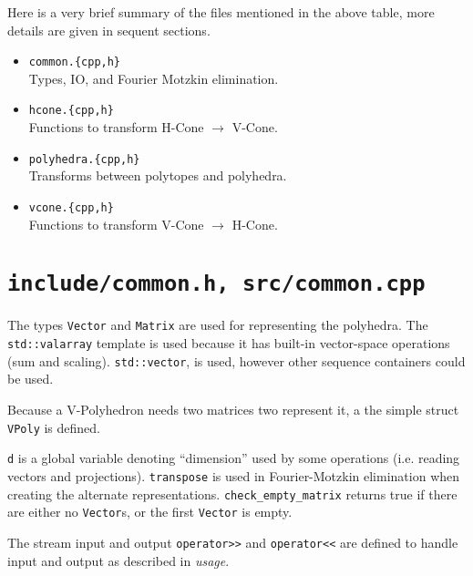 \vspace{1em}

Here is a very brief summary of the files mentioned in the above table, more details are given in sequent sections.

\begin{itemize}
  \item \texttt{common.\{cpp,h\}}\\
    Types, IO, and Fourier Motzkin elimination.
  \item \texttt{hcone.\{cpp,h\}}\\
    Functions to transform H-Cone $\to$ V-Cone.
  \item \texttt{polyhedra.\{cpp,h\}}\\
    Transforms between polytopes and polyhedra.
  \item \texttt{vcone.\{cpp,h\}}\\
    Functions to transform V-Cone $\to$ H-Cone.
\end{itemize}



\section{\texttt{include/common.h, src/common.cpp}}
\lstVecMat
The types \lstinline{Vector} and \lstinline{Matrix} are used for representing the polyhedra.  The \lstinline{std::valarray} template is used because it has built-in vector-space operations (sum and scaling).  \lstinline{std::vector}, is used, however other sequence containers could be used.

\lstVPoly
Because a V-Polyhedron needs two matrices two represent it, a the simple struct \lstinline{VPoly} is defined.

\lstD
\lstinline{d} is a global variable denoting ``dimension'' used by some operations (i.e. reading vectors and projections).  \lstinline{transpose} is used in Fourier-Motzkin elimination when creating the alternate representations.  \lstinline{check_empty_matrix}  returns true if there are either no \lstinline{Vector}s, or the first \lstinline{Vector} is empty.

\lstIstream
\lstOstream
The stream input and output \lstinline{operator>>} and \lstinline{operator<<} are defined to handle input and output as described in \textit{usage}.  

